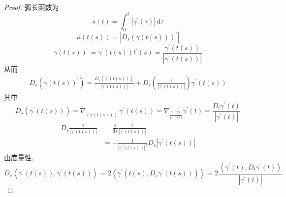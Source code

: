 \documentclass[../../几何与拓扑.tex]{subfiles}
\begin{document}
\begin{proof}
    弧长函数为 \[
    s\left( t \right)=  \int_{0}^{t}\left|  \gamma ^{\prime} \left( \tau  \right)  \right|\,\mathrm{d} \tau   
    \] \[
     \kappa \left( t\left( s \right)  \right)= \left| D_{s}\left(  \gamma \left( t\left( s \right)  \right)  \right)^{\prime}   \right|  
    \] \[
     \gamma \left( t\left( s \right)  \right)^{\prime} =   \gamma ^{\prime} \left( t\left( s \right)  \right) t^{\prime} \left( s \right)   = \frac{ \gamma ^{\prime} \left( t\left( s \right)  \right)  }{\left|  \gamma ^{\prime} \left( t\left( s \right)  \right)  \right|  } 
    \] 从而 \[
    \begin{aligned}
    D_{s} \left(  \gamma \left( t\left( s \right)  \right)^{\prime}   \right)=  \frac{D_{s}\left(  \gamma ^{\prime} \left( t\left( s \right)  \right)  \right)  }{\left|  \gamma ^{\prime} \left( t\left( s \right)  \right)  \right|  }+ D_{s}\left( \frac{1 }{\left|  \gamma ^{\prime} \left( t\left( s \right)  \right)  \right|  }  \right)     \gamma ^{\prime} \left( t\left( s \right)  \right) 
    \end{aligned}
    \]其中 \[
    D_{s}\left(  \gamma ^{\prime} \left( t\left( s \right)  \right)  \right)=  \nabla _{ \left(  \gamma \left( t\left( s \right)  \right)  \right)^{\prime}   } \gamma ^{\prime} \left( t\left( s \right)  \right)=  \nabla _{ \frac{\gamma ^{\prime} \left( t \right) }{\left|  \gamma ^{\prime} \left( t \right)  \right|  }  }  \gamma ^{\prime} \left( t \right)= \frac{D_{t} \gamma ^{\prime} \left( t \right)  }{\left|  \gamma ^{\prime} \left( t \right)  \right|  } 
    \] \[
    \begin{aligned}
        D_{s}\frac{1 }{\left|  \gamma ^{\prime} \left( t\left( s \right)  \right)  \right|  }&= \frac{\mathrm{d}}{\mathrm{d}s} \frac{1 }{\left|  \gamma ^{\prime} \left( t\left( s \right)  \right)  \right|  }\\ 
         &=  -\frac{1 }{\left|  \gamma ^{\prime} \left( t\left( s \right)  \right)  \right|^{2}  }  D_{s}\left|  \gamma ^{\prime} \left( t\left( s \right)  \right)  \right| 
    \end{aligned}  
    \]
    由度量性,  \[
    D_{s}\left< \gamma ^{\prime} \left( t\left( s \right)  \right), \gamma ^{\prime} \left( t\left( s \right)  \right)   \right>= 2 \left< \gamma ^{\prime} \left( t\left( s \right),D_{s} \gamma ^{\prime} \left( t\left( s \right)  \right)   \right)  \right>= 2\frac{\left< \gamma ^{\prime} \left( t \right),D_{t} \gamma ^{\prime} \left( t \right)   \right> }{\left|  \gamma ^{\prime} \left( t \right)  \right|  } 
\]
\end{proof}
\end{document}
